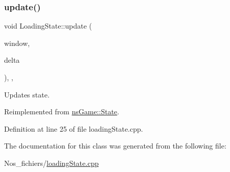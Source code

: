 \subsubsection{\texorpdfstring{update()}{update()}}
{\footnotesize\ttfamily void Loading\+State\+::update (\begin{DoxyParamCaption}\item[{Min\+GL \&}]{window,  }\item[{unsigned}]{delta }\end{DoxyParamCaption})\hspace{0.3cm}{\ttfamily [inline]}, {\ttfamily [override]}, {\ttfamily [virtual]}}



Updates state. 



Reimplemented from \hyperlink{structns_game_1_1_state_ae809e89ac9df4a43ab90d5d5932e2bc7}{ns\+Game\+::\+State}.



Definition at line 25 of file loading\+State.\+cpp.



The documentation for this class was generated from the following file\+:\begin{DoxyCompactItemize}
\item 
Nos\+\_\+fichiers/\hyperlink{loading_state_8cpp}{loading\+State.\+cpp}\end{DoxyCompactItemize}
